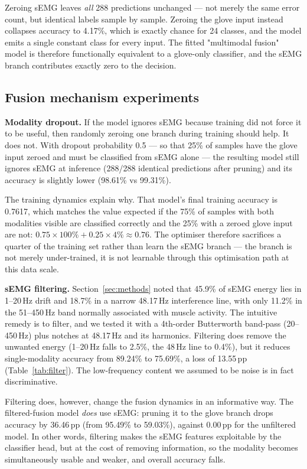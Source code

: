 \documentclass[11pt,a4paper]{article}
\begin{document}
Zeroing sEMG leaves \emph{all} 288 predictions unchanged --- not merely the same error count, but identical labels sample by sample. Zeroing the glove input instead collapses accuracy to 4.17\%, which is exactly chance for 24 classes, and the model emits a single constant class for every input. The fitted "multimodal fusion" model is therefore functionally equivalent to a glove-only classifier, and the sEMG branch contributes exactly zero to the decision.

\subsection{Fusion mechanism experiments}
\label{sec:mech}

\textbf{Modality dropout.} If the model ignores sEMG because training did not force it to be useful, then randomly zeroing one branch during training should help. It does not. With dropout probability 0.5 --- so that 25\% of samples have the glove input zeroed and must be classified from sEMG alone --- the resulting model still ignores sEMG at inference (288/288 identical predictions after pruning) and its accuracy is slightly lower (98.61\% vs 99.31\%).

The training dynamics explain why. That model's final training accuracy is 0.7617, which matches the value expected if the 75\% of samples with both modalities visible are classified correctly and the 25\% with a zeroed glove input are not: $0.75\times100\% + 0.25\times4\% \approx 0.76$. The optimiser therefore sacrifices a quarter of the training set rather than learn the sEMG branch --- the branch is not merely under-trained, it is not learnable through this optimisation path at this data scale.

\textbf{sEMG filtering.} Section~\ref{sec:methods} noted that 45.9\% of sEMG energy lies in 1--20\,Hz drift and 18.7\% in a narrow 48.17\,Hz interference line, with only 11.2\% in the 51--450\,Hz band normally associated with muscle activity. The intuitive remedy is to filter, and we tested it with a 4th-order Butterworth band-pass (20--450\,Hz) plus notches at 48.17\,Hz and its harmonics. Filtering does remove the unwanted energy (1--20\,Hz falls to 2.5\%, the 48\,Hz line to 0.4\%), but it reduces single-modality accuracy from 89.24\% to 75.69\%, a loss of 13.55\,pp (Table~\ref{tab:filter}). The low-frequency content we assumed to be noise is in fact discriminative.

Filtering does, however, change the fusion dynamics in an informative way. The filtered-fusion model \emph{does} use sEMG: pruning it to the glove branch drops accuracy by 36.46\,pp (from 95.49\% to 59.03\%), against 0.00\,pp for the unfiltered model. In other words, filtering makes the sEMG features exploitable by the classifier head, but at the cost of removing information, so the modality becomes simultaneously usable and weaker, and overall accuracy falls.
\end{document}
